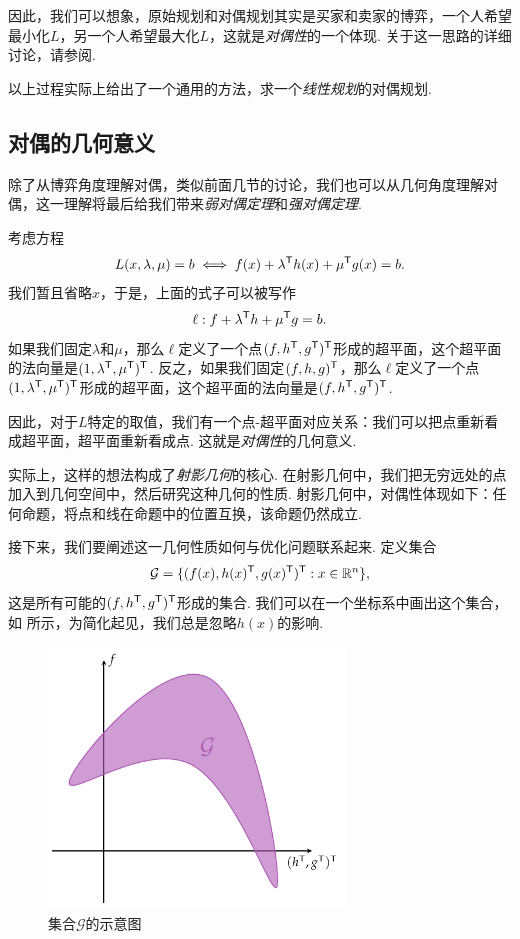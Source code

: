 因此，我们可以想象，原始规划和对偶规划其实是买家和卖家的博弈，一个人希望最小化$L$，另一个人希望最大化$L$，这就是\textit{对偶性}的一个体现. 关于这一思路的详细讨论，请参阅. 

\begin{remark}
    以上过程实际上给出了一个通用的方法，求一个\textit{线性规划}的对偶规划. 
\end{remark}

\subsection{对偶的几何意义}

除了从博弈角度理解对偶，类似前面几节的讨论，我们也可以从几何角度理解对偶，这一理解将最后给我们带来\textit{弱对偶定理}和\textit{强对偶定理}.

考虑方程
\[L(x,\lambda,\mu)=b\iff f(x)+\lambda^{\mathsf{T}} h(x)+\mu^{\mathsf{T}} g(x)=b.\]
我们暂且省略$x$，于是，上面的式子可以被写作
\[\ell: f+\lambda^{\mathsf{T}} h+\mu^{\mathsf{T}} g=b.\]
如果我们固定$\lambda$和$\mu$，那么$\ell$定义了一个点$(f,h^{\mathsf{T}},g^{\mathsf{T}})^{\mathsf{T}}$形成的超平面，这个超平面的法向量是$(1,\lambda^{\mathsf{T}},\mu^{\mathsf{T}})^{\mathsf{T}}$. 反之，如果我们固定$(f,h,g)^{\mathsf{T}}$，那么$\ell$定义了一个点$(1,\lambda^{\mathsf{T}},\mu^{\mathsf{T}})^{\mathsf{T}}$形成的超平面，这个超平面的法向量是$(f,h^{\mathsf{T}},g^{\mathsf{T}})^{\mathsf{T}}$.

因此，对于$L$特定的取值，我们有一个点-超平面对应关系：我们可以把点重新看成超平面，超平面重新看成点. 这就是\textit{对偶性}的几何意义.

\begin{remark}
    实际上，这样的想法构成了\textit{射影几何}的核心. 在射影几何中，我们把无穷远处的点加入到几何空间中，然后研究这种几何的性质. 射影几何中，对偶性体现如下：任何命题，将点和线在命题中的位置互换，该命题仍然成立. 
\end{remark}

接下来，我们要阐述这一几何性质如何与优化问题联系起来. 定义集合
\[\mathcal{G}=\{(f(x),h(x)^{\mathsf{T}},g(x)^{\mathsf{T}})^{\mathsf{T}}:x\in\mathbb{R}^n\},\]
这是所有可能的$(f,h^{\mathsf{T}},g^{\mathsf{T}})^{\mathsf{T}}$形成的集合. 我们可以在一个坐标系中画出这个集合，如 所示，为简化起见，我们总是忽略$h(x)$的影响.

\begin{figure}[htbp]
    \centering
    \includegraphics[width=0.7\textwidth]{figures/duality/duality-G-set.pdf}
    \caption{集合$\mathcal{G}$的示意图}
    \label{fig:duality-G-set}
\end{figure}

